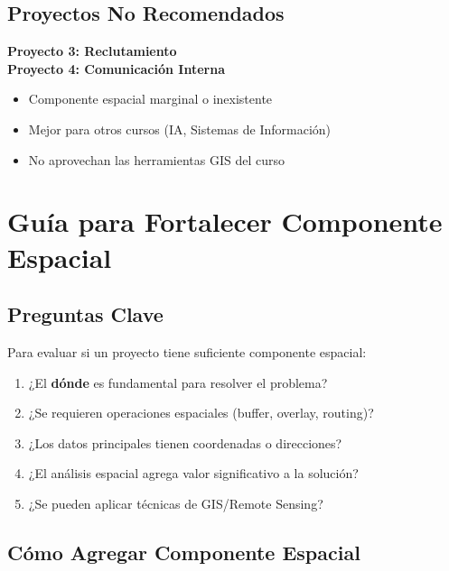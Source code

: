 \documentclass[11pt,a4paper]{article}
\newcommand{\bajo}[1]{\textcolor{rojo}{\textbf{#1}}}
\begin{document}
\subsection{Proyectos No Recomendados}

\begin{tcolorbox}[colframe=rojo,colback=red!10,title=\bajo{BAJO POTENCIAL}]
\textbf{Proyecto 3: Reclutamiento}\\
\textbf{Proyecto 4: Comunicación Interna}
\begin{itemize}
    \item Componente espacial marginal o inexistente
    \item Mejor para otros cursos (IA, Sistemas de Información)
    \item No aprovechan las herramientas GIS del curso
\end{itemize}
\end{tcolorbox}

\newpage

\section{Guía para Fortalecer Componente Espacial}

\subsection{Preguntas Clave}

Para evaluar si un proyecto tiene suficiente componente espacial:

\begin{enumerate}
    \item ¿El \textbf{dónde} es fundamental para resolver el problema?
    \item ¿Se requieren operaciones espaciales (buffer, overlay, routing)?
    \item ¿Los datos principales tienen coordenadas o direcciones?
    \item ¿El análisis espacial agrega valor significativo a la solución?
    \item ¿Se pueden aplicar técnicas de GIS/Remote Sensing?
\end{enumerate}

\subsection{Cómo Agregar Componente Espacial}
\end{document}
